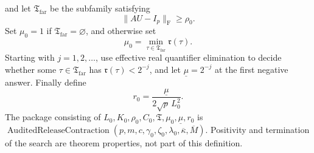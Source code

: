and let \(\mathfrak T_{\mathrm{far}}\) be the subfamily satisfying
\[
 \|AU-I_p\|_{\mathrm F}\geq\rho _0.
\]
Set \(\mu _0=1\) if \(\mathfrak T_{\mathrm{far}}=\varnothing\), and otherwise set
\[
 \mu _0=\min_{\tau\in\mathfrak T_{\mathrm{far}}}\mathfrak r(\tau).
\]
Starting with \(j=1,2,\ldots\), use effective real quantifier elimination to decide whether some \(\tau\in\mathfrak T_{\mathrm{far}}\) has \(\mathfrak r(\tau)<2^{-j}\), and let \(\underline\mu=2^{-j}\) at the first negative answer.  Finally define
\[
 r_0=\frac{\underline\mu}{2\sqrt p\,L_0^2}.
\]
The package consisting of \(L_0,K_0,\rho _0,C_0,\mathfrak T,\mu _0,\underline\mu,r_0\) is \(\operatorname{AuditedReleaseContraction}(p,m,c,\gamma _0,\zeta _0,\lambda _0,\overline\kappa,\overline M)\).  Positivity and termination of the search are theorem properties, not part of this definition.
